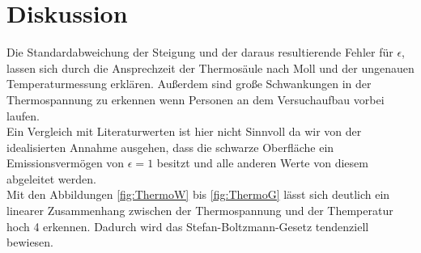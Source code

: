 \section{Diskussion}
\label{sec:Diskussion}
Die Standardabweichung der Steigung und der daraus resultierende Fehler für $\epsilon$, lassen sich durch die Ansprechzeit der Thermosäule nach Moll und der ungenauen Temperaturmessung erklären. Außerdem sind große Schwankungen in der Thermospannung zu erkennen wenn Personen an dem Versuchaufbau vorbei laufen.
\\
Ein Vergleich mit Literaturwerten ist hier nicht Sinnvoll da wir von der idealisierten Annahme ausgehen, dass die schwarze Oberfläche ein Emissionsvermögen von $\epsilon = 1$ besitzt und alle anderen Werte von diesem abgeleitet werden.
\\
Mit den Abbildungen \ref{fig:ThermoW} bis \ref{fig:ThermoG} lässt sich deutlich ein linearer Zusammenhang zwischen der Thermospannung und der Themperatur hoch 4 erkennen. Dadurch wird das Stefan-Boltzmann-Gesetz tendenziell bewiesen.
